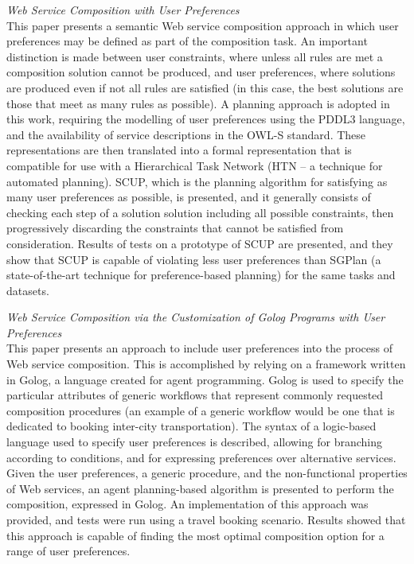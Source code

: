 \textit{Web Service Composition with User Preferences \cite{lin2008web}}\\
This paper presents a semantic Web service composition approach in which user preferences may be defined as part of the composition
task. An important distinction is made between user constraints, where unless all rules are met a composition solution cannot be produced,
and user preferences, where solutions are produced even if not all rules are satisfied (in this case, the best solutions are those that
meet as many rules as possible). A planning approach is adopted in this work, requiring the modelling of user preferences using the PDDL3
language, and the availability of service descriptions in the OWL-S standard. These representations are then translated into a formal
representation that is compatible for use with a Hierarchical Task Network (HTN -- a technique for automated planning). SCUP, which is the planning
algorithm for satisfying as many user preferences as possible, is presented, and it generally consists of checking each step of a solution
solution including all possible constraints, then progressively discarding the constraints that cannot be satisfied from consideration.
Results of tests on a prototype of SCUP are presented, and they show that SCUP is capable of violating less user preferences than SGPlan
(a state-of-the-art technique for preference-based planning) for the same tasks and datasets.

\textit{Web Service Composition via the Customization of Golog Programs with User Preferences \cite{sohrabi2009web}}\\
This paper presents an approach to include user preferences into the process of Web service composition. This is
accomplished by relying on a framework written in Golog, a language created for agent programming. Golog is used
to specify the particular attributes of generic workflows that represent commonly requested composition procedures
(an example of a generic workflow would be one that is dedicated to booking inter-city transportation).
The syntax of a logic-based language used to specify user preferences is described, allowing for
branching according to conditions, and for expressing preferences over alternative services. Given the user preferences,
a generic procedure, and the non-functional properties of Web services, an agent planning-based algorithm is presented
to perform the composition, expressed in Golog. An implementation of this approach was provided, and tests were run
using a travel booking scenario. Results showed that this approach is capable of finding the most optimal composition
option for a range of user preferences.

